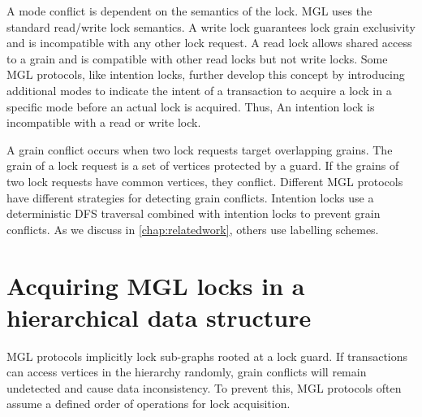 A mode conflict is dependent on the semantics of the lock. MGL uses the standard read/write lock semantics. A write lock guarantees lock grain exclusivity and is incompatible with any other lock request. A read lock allows shared access to a grain and is compatible with other read locks but not write locks. Some MGL protocols, like intention locks, further develop this concept by introducing additional modes to indicate the intent of a transaction to acquire a lock in a specific mode before an actual lock is acquired. Thus, An intention lock is incompatible with a read or write lock. 

A grain conflict occurs when two lock requests target overlapping grains. The grain of a lock request is a set of vertices protected by a guard. If the grains of two lock requests have common vertices, they conflict. Different MGL protocols have different strategies for detecting grain conflicts. Intention locks use a deterministic DFS traversal combined with intention locks to prevent grain conflicts. As we discuss in \cref{chap:relatedwork}, others use labelling schemes.


\section{Acquiring MGL locks in a hierarchical data structure} \label{sec:lockAcquisitionProtocol}
MGL protocols implicitly lock sub-graphs rooted at a lock guard. If transactions can access vertices in the hierarchy randomly, grain conflicts will remain undetected and cause data inconsistency. To prevent this, MGL protocols often assume a defined order of operations for lock acquisition. 

